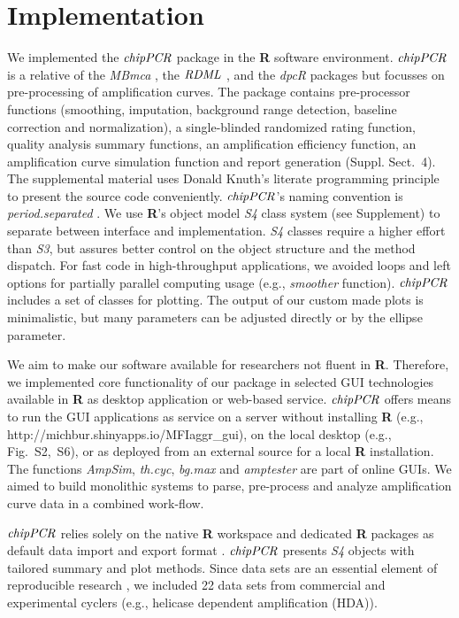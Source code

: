 \documentclass{bioinfo}
\begin{document}
\section{Implementation}
\begin{methods}
We implemented the $\emph{chipPCR}$ package in the \textbf{R} software 
environment. $\emph{chipPCR}$ is a relative of the \emph{MBmca} 
\citep{roediger_RJ_2013}, the $\emph{RDML}$ \citep{blagodatskikh_2014}, and the 
\emph{dpcR} \citep{pabinger_2014} packages but focusses on pre-processing of 
amplification curves. The package contains pre-processor functions (smoothing, 
imputation, background range detection, baseline correction and normalization), a single-blinded 
randomized rating function, quality analysis summary functions, an amplification 
efficiency function, an amplification curve simulation function and report 
generation (Suppl. Sect.~4). The supplemental material uses Donald Knuth's 
literate programming principle~\citep{Knuth1984} to present the source code 
conveniently. $\emph{chipPCR}$'s naming convention is \textit{period.separated} 
\citep{Baaaath_2012}. We use \textbf{R}'s object model \emph{S4} class system 
(see Supplement) to separate between interface and implementation. \emph{S4} 
classes require a higher effort than \emph{S3}, but assures better control on 
the object structure and the method dispatch. For fast code in high-throughput 
applications, we avoided loops and left options for 
partially parallel computing usage (e.g., \textsl{smoother} function). 
$\emph{chipPCR}$ includes a set of classes for plotting. The output of our 
custom made plots is minimalistic, but many parameters can be adjusted directly 
or by the ellipse parameter.

We aim to make our software available for researchers not fluent in 
\textbf{R}. Therefore, we implemented core functionality of our package in 
selected GUI technologies available in \textbf{R} \citep{rodiger_rkward_2012} as 
desktop application or web-based service. $\emph{chipPCR}$ offers means to run 
the GUI applications as service on a server without installing \textbf{R} (e.g., 
http://michbur.shinyapps.io/MFIaggr\_gui), on the local 
desktop (e.g., Fig.~S2,~S6), or as deployed from an external %
source for a local \textbf{R} installation. The functions \textsl{AmpSim}, 
\textsl{th.cyc}, \textsl{bg.max} and \textsl{amptester} are part of online GUIs. 
We aimed to build monolithic systems to parse, pre-process and analyze 
amplification curve data in a combined work-flow. 

$\emph{chipPCR}$ relies solely on the native \textbf{R} 
workspace and dedicated \textbf{R} packages as default data import 
and export format \citep{perkins_2012,rodiger_rkward_2012,blagodatskikh_2014}. 
$\emph{chipPCR}$ presents \emph{S4} objects with tailored summary and plot 
methods. Since data sets are an essential element of reproducible research 
\citep{Leeper_2014}, we included 22 data sets from commercial and 
experimental cyclers (e.g., helicase 
dependent amplification (HDA)).
\end{methods}
\end{document}
